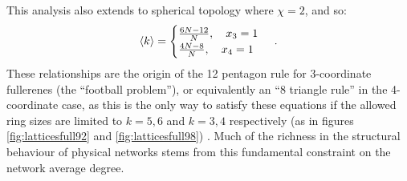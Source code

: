 This analysis also extends to spherical topology where $\chi=2$, and so:
 \begin{equation}
 	\label{eq:2dsphericalcases}
	\langle k \rangle = \begin{cases}
		\frac{6N-12}{N}, \quad x_3 = 1 \\
		\frac{4N-8}{N}, \quad x_4 = 1
	\end{cases}\,.
\end{equation}
These relationships are the origin of the 12 pentagon rule for 3-coordinate fullerenes (the ``football problem''), or equivalently an ``8 triangle rule'' in the 4\--coordinate case, as this is the only way to satisfy these equations if the allowed ring sizes are limited to $k=5,6$ and $k=3,4$ respectively (as in figures \ref{fig:latticesfull92} and \ref{fig:latticesfull98}) \cite{Fowler1996}.
Much of the richness in the structural behaviour of \td{} physical networks stems from this fundamental constraint on the network average degree.

